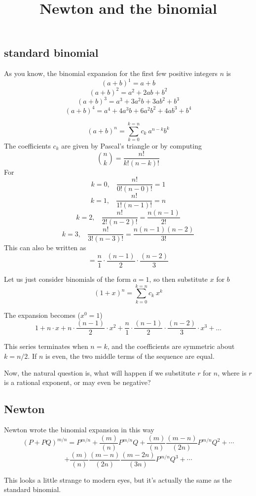 \documentclass[11pt, oneside]{article}
\title{Newton and the binomial}
\date{}
\begin{document}
\maketitle
\Large

\subsection*{standard binomial}

As you know, the binomial expansion for the first few positive integers $n$ is
\[ (a+b)^1 = a + b \]
\[ (a+b)^2 = a^2 + 2ab + b^2 \]
\[ (a+b)^3 = a^3 + 3a^2b + 3ab^2 + b^3 \]
\[ (a+b)^4 = a^4 + 4a^3b + 6a^2b^2 + 4ab^3 + b^4 \]

\[ (a + b)^n = \sum_{k=0}^{k=n} c_k \ a^{n-k} b^{k} \]
The coefficients $c_k$ are given by Pascal's triangle or by computing
\[ \binom{n}{k} = \frac{n!}{k!(n-k)!}  \]
For 
\[ k = 0, \ \ \ \ \frac{n!}{0!(n-0)!} = 1 \]
\[ k = 1, \ \ \ \ \frac{n!}{1!(n-1)!} = n \]
\[ k = 2, \ \ \ \ \frac{n!}{2!(n-2)!} = \frac{n(n-1)}{2!} \]
\[ k = 3, \ \ \ \ \frac{n!}{3!(n-3)!} = \frac{n(n-1)(n-2)}{3!} \]
This can also be written as
\[ = \frac{n}{1} \cdot \frac{(n-1)}{2} \cdot \frac{(n-2)}{3} \]

Let us just consider binomials of the form $a = 1$, so then substitute $x$ for $b$
\[ (1 + x)^n = \sum_{k=0}^{k=n} c_k \ x^k \]

The expansion becomes ($x^0 = 1$)
\[ 1 + n \cdot x + n \cdot \frac{(n-1)}{2} \cdot x^2 + \frac{n}{1} \cdot \frac{(n-1)}{2} \cdot \frac{(n-2)}{3} \cdot x^3 + \dots \]

This series terminates when $n = k$, and the coefficients are symmetric about $k=n/2$.  If $n$ is even, the two middle terms of the sequence are equal.

Now, the natural question is, what will happen if we substitute $r$ for $n$, where is $r$ is a rational exponent, or may even be negative?

\subsection*{Newton}

Newton wrote the binomial expansion in this way
\[ (P + PQ)^{m/n} = P^{m/n} + \frac{(m)}{(n)}P^{m/n}Q + \frac{(m)}{(n)}\frac{(m-n)}{(2n)}P^{m/n}Q^2 + \cdots \]
\[ + \frac{(m)}{(n)}\frac{(m-n)}{(2n)}\frac{(m-2n)}{(3n)}P^{m/n}Q^3 + \cdots \] 

This looks a little strange to modern eyes, but it's actually the same as the standard binomial. 
\end{document}
